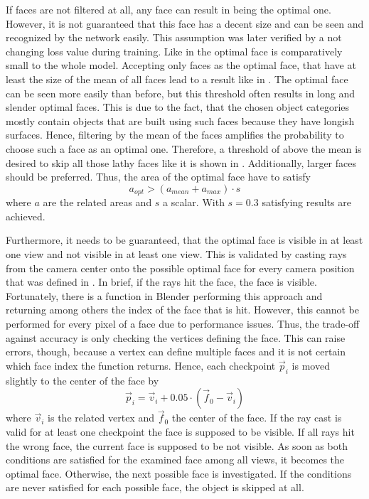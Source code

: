 If faces are not filtered at all, any face can result in being the optimal one.
However, it is not guaranteed that this face has a decent size and can be seen and recognized by the network easily.
This assumption was later verified by a not changing loss value during training.
Like in  the optimal face is comparatively small to the whole model.
Accepting only faces as the optimal face, that have at least the size of the mean of all faces lead to a result like in .
The optimal face can be seen more easily than before, but this threshold often results in long and slender optimal faces.
This is due to the fact, that the chosen object categories mostly contain objects that are built using such faces because they have longish surfaces.
Hence, filtering by the mean of the faces amplifies the probability to choose such a face as an optimal one.
Therefore, a threshold of above the mean is desired to skip all those lathy faces like it is shown in .
Additionally, larger faces should be preferred.
Thus, the area of the optimal face have to satisfy
\begin{equation}
	a_{opt} > (a_{mean} + a_{max}) \cdot s
\end{equation}
where $a$ are the related areas and $s$ a scalar.
With $s = 0.3$ satisfying results are achieved.

Furthermore, it needs to be guaranteed, that the optimal face is visible in at least one view and not visible in at least one view.
This is validated by casting rays from the camera center onto the possible optimal face for every camera position that was defined in .
In brief, if the rays hit the face, the face is visible.
Fortunately, there is a function in Blender performing this approach and returning among others the index of the face that is hit.
However, this cannot be performed for every pixel of a face due to performance issues.
Thus, the trade-off against accuracy is only checking the vertices defining the face.
This can raise errors, though, because a vertex can define multiple faces and it is not certain which face index the function returns.
Hence, each checkpoint $\vec{p}_i$ is moved slightly to the center of the face by
\begin{equation}
	\vec{p}_i = \vec{v}_i + 0.05 \cdot (\vec{f}_0 - \vec{v}_i)
\end{equation}
where $\vec{v}_i$ is the related vertex and $\vec{f}_0$ the center of the face.
If the ray cast is valid for at least one checkpoint the face is supposed to be visible.
If all rays hit the wrong face, the current face is supposed to be not visible.
As soon as both conditions are satisfied for the examined face among all views, it becomes the optimal face.
Otherwise, the next possible face is investigated.
If the conditions are never satisfied for each possible face, the object is skipped at all.

